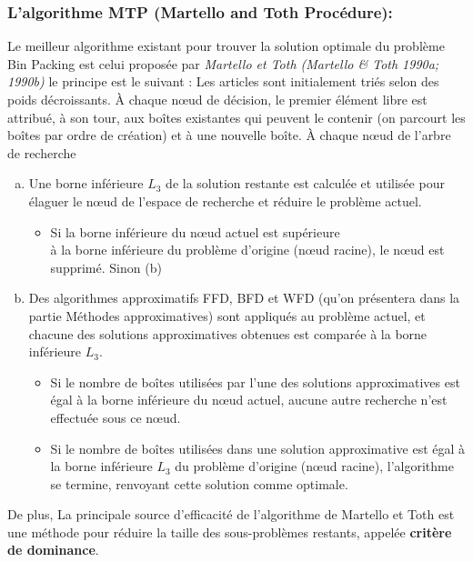 \documentclass[class=report, crop=false]{standalone}
\begin{document}
    \subsubsection*{L’algorithme MTP (Martello and Toth Procédure):}
    Le meilleur algorithme existant pour trouver la solution optimale du problème Bin Packing est celui proposée par  \emph{Martello et Toth (Martello \& Toth 1990a; 1990b)} \cite{key} le principe est le suivant :  
Les articles sont initialement triés selon des poids décroissants. À chaque nœud de décision, le premier élément libre est attribué, à son tour, aux boîtes existantes qui peuvent le contenir (on parcourt les boîtes par ordre de création) et à une nouvelle boîte. 
À chaque nœud de l'arbre de recherche 
\begin{enumerate}[a.]
    \item Une borne inférieure \(L_3\) de la solution restante est calculée et utilisée pour élaguer le nœud de l'espace de recherche et réduire le problème actuel.
        \begin{itemize}
            \item Si la borne inférieure du nœud actuel est supérieure \\
            à la borne inférieure du problème d’origine (nœud racine), le nœud est supprimé. Sinon (b)
        \end{itemize}
    \item Des algorithmes approximatifs FFD, BFD et WFD (qu’on présentera dans la partie Méthodes approximatives) sont appliqués au problème actuel, et chacune des solutions approximatives obtenues est comparée à la borne inférieure \(L_3\).
        \begin{itemize}
            \item Si le nombre de boîtes utilisées par l'une des solutions approximatives est égal à la borne inférieure du nœud actuel, aucune autre recherche n'est effectuée sous ce nœud. 
            \item Si le nombre de boîtes utilisées dans une solution approximative est égal à la borne inférieure \(L_3\) du problème d'origine (nœud racine), l'algorithme se termine, renvoyant cette solution comme optimale.
        \end{itemize}
\end{enumerate}
De plus, La principale source d'efficacité de l'algorithme de Martello et Toth est une méthode pour réduire la taille des sous-problèmes restants, appelée \textbf{critère de dominance}.
\end{document}
